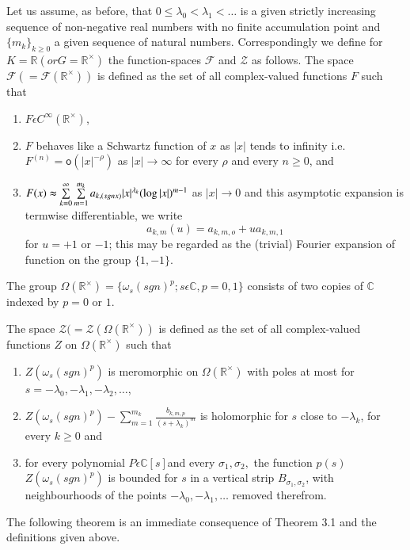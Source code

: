  Let us assume, as before, that $0\le \lambda_{0}<\lambda_{1}< \ldots$
 is a given strictly increasing sequence of non-negative real numbers
 with no finite accumulation point and $\{m_{k}\}_{k\ge 0}$ a given
 sequence of natural numbers. Correspondingly we define for
 $K=\mathbb{R}(or G=\mathbb{R}^\times)$ the function-spaces $\mathscr{F}$
 and $\mathscr{Z}$ as follows. The space
 $\mathscr{F}(=\mathscr{F}(\mathbb{R}^\times))$ is defined as the set of
 all complex-valued functions $F$ such that 
\begin{enumerate}
\renewcommand{\theenumi}{\roman{enumi}}
\renewcommand{\labelenumi}{(\theenumi)}
\item $F\epsilon C^{\infty}({\mathbb{R}^\times})$,\pageoriginale

\item $F$ behaves like a  Schwartz function of $x$ as $|x|$ tends to
  infinity i.e. $F^{(n)}=\mathsf{o}(|x|^{-\rho})$ as $|x|\rightarrow
  \infty$ for every $\rho $ and every $n\ge 0$, and 

\item $F(x)\thickapprox \sum\limits_{k=0}^{\infty}
  \sum\limits_{m=1}^{m_{k}} a_{k, (sgn x)}|x|^{\lambda_{k}}(\log
  |x|)^{m-1}$ as $|x|\rightarrow 0$ and this asymptotic expansion is
  termwise differentiable, we write 
  \begin{equation*}
    a_{k,m}(u)=a_{k,m,o}+ua_{k,m,1}\tag{13}\label{chap1:sec4:subsec2:eq13}
  \end{equation*}
  for $u=+1$ or $-1$; this may be regarded as the (trivial) Fourier
  expansion of function on the group $\{1,-1\}$.
\end{enumerate}

  The group $\Omega(\mathbb{R}^\times)=\{\omega_{s}(sgn)^p;s\epsilon
  \mathbb{C}, p=0,1\}$ consists of two copies of $\mathbb{C}$ indexed
  by $p=0$ or $1$. 

The space
$\mathscr{Z}(=\mathscr{Z}(\Omega(\mathbb{R}^\times))$ is defined as the
set of all complex-valued functions $Z$ on $\Omega(\mathbb{R}^\times)$
such that
\begin{enumerate}
\renewcommand{\labelenumi}{(\theenumi)}
\item $Z(\omega_s(sgn)^p)$ is meromorphic on
  $\Omega(\mathbb{R}^\times)$ with poles at most for
  $s=-\lambda_0,-\lambda_1,-\lambda_2,\ldots$,
\item $Z(\omega_s(sgn)^p)
  -\sum\limits_{m=1}^{m_{k}}\frac{b_{k,m,p}}{(s+\lambda_{k})^m}$  is
    holomorphic for $s$ close to $-\lambda_{k}$, for every $k\ge 0$
    and 
\item for every polynomial $P\epsilon\mathbb{C}[s]$and every
  $\sigma_{1},\sigma_{2},$ the function $p(s)$ $Z(\omega_{s}(sgn)^{p})$
  is bounded for $s$ in a vertical strip $B_{\sigma_{1},\sigma_{2}}$,
  with neighbourhoods of the points $-\lambda_{0},-\lambda_{1},\ldots$
  removed therefrom.
\end{enumerate}
The following theorem is an immediate consequence of Theorem 3.1 and
the definitions given above.


